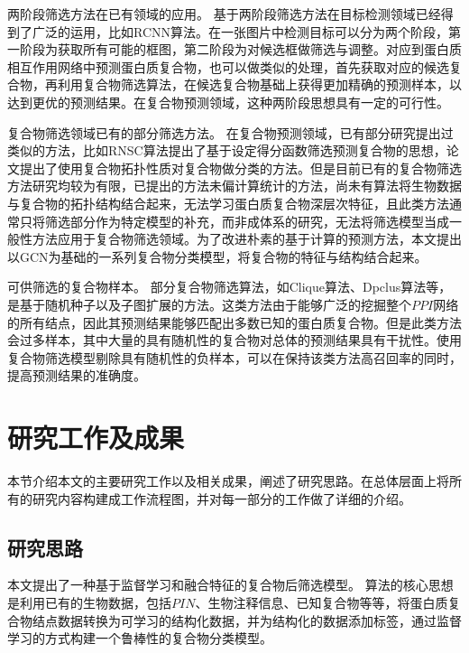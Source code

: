 两阶段筛选方法在已有领域的应用。
基于两阶段筛选方法在目标检测领域已经得到了广泛的运用，比如RCNN算法\cite{girshick_rich_2014}。在一张图片中检测目标可以分为两个阶段，第一阶段为获取所有可能的框图，第二阶段为对候选框做筛选与调整。对应到蛋白质相互作用网络中预测蛋白质复合物，也可以做类似的处理，首先获取对应的候选复合物，再利用复合物筛选算法，在候选复合物基础上获得更加精确的预测样本，以达到更优的预测结果。在复合物预测领域，这种两阶段思想具有一定的可行性。

复合物筛选领域已有的部分筛选方法。
在复合物预测领域，已有部分研究提出过类似的方法，比如RNSC算法\cite{king_protein_2004}提出了基于设定得分函数筛选预测复合物的思想，论文\cite{yu_predicting_2014}提出了使用复合物拓扑性质对复合物做分类的方法。但是目前已有的复合物筛选方法研究均较为有限，已提出的方法未偏计算统计的方法，尚未有算法将生物数据与复合物的拓扑结构结合起来，无法学习蛋白质复合物深层次特征，且此类方法通常只将筛选部分作为特定模型的补充，而非成体系的研究，无法将筛选模型当成一般性方法应用于复合物筛选领域。为了改进朴素的基于计算的预测方法，本文提出以GCN为基础的一系列复合物分类模型，将复合物的特征与结构结合起来。

可供筛选的复合物样本。
部分复合物筛选算法，如Clique算法\cite{spirin_protein_2003}、Dpclus算法等，是基于随机种子以及子图扩展的方法。这类方法由于能够广泛的挖掘整个$PPI$网络的所有结点，因此其预测结果能够匹配出多数已知的蛋白质复合物。但是此类方法会过多样本，其中大量的具有随机性的复合物对总体的预测结果具有干扰性。使用复合物筛选模型剔除具有随机性的负样本，可以在保持该类方法高召回率的同时，提高预测结果的准确度。

\section{研究工作及成果}
\label{section:intro:workandresult}

本节介绍本文的主要研究工作以及相关成果，阐述了研究思路。在总体层面上将所有的研究内容构建成工作流程图，并对每一部分的工作做了详细的介绍。

\subsection{研究思路}
\label{subsection:motivationAndThinking:thinking}

本文提出了一种基于监督学习和融合特征的复合物后筛选模型。
算法的核心思想是利用已有的生物数据，包括$PIN$、生物注释信息、已知复合物等等，将蛋白质复合物结点数据转换为可学习的结构化数据，并为结构化的数据添加标签，通过监督学习的方式构建一个鲁棒性的复合物分类模型。

